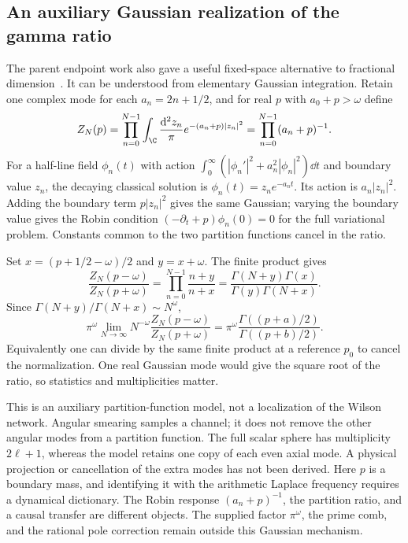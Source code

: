 \subsection{An auxiliary Gaussian realization of the gamma ratio}

The parent endpoint work also gave a useful fixed-space alternative
to fractional dimension~\cite{ParentAngular}. It can be understood
from elementary Gaussian integration. Retain one complex mode for
each $a_n=2n+1/2$, and for real $p$ with $a_0+p>\omega$ define
\begin{equation}
 Z_N(p)=\prod_{n=0}^{N-1}\int_\C\frac{\mathrm d^2z_n}{\pi}
             e^{-(a_n+p)|z_n|^2}
       =\prod_{n=0}^{N-1}(a_n+p)^{-1}.
\end{equation}
For a half-line field $\phi_n(t)$ with action
$\int_0^\infty(|\phi_n'|^2+a_n^2|\phi_n|^2)\dd t$ and boundary value
$z_n$, the decaying classical solution is $\phi_n(t)=z_ne^{-a_nt}$.
Its action is $a_n|z_n|^2$. Adding the boundary term $p|z_n|^2$
gives the same Gaussian; varying the boundary value gives the Robin
condition $(-\partial_t+p)\phi_n(0)=0$ for the full variational problem.
Constants common to the two partition functions cancel in the ratio.

Set $x=(p+1/2-\omega)/2$ and $y=x+\omega$. The finite product gives
\begin{equation}
 \frac{Z_N(p-\omega)}{Z_N(p+\omega)}
 =\prod_{n=0}^{N-1}\frac{n+y}{n+x}
 =\frac{\Gamma(N+y)\Gamma(x)}{\Gamma(y)\Gamma(N+x)}.
\end{equation}
Since $\Gamma(N+y)/\Gamma(N+x)\sim N^{\omega}$,
\begin{equation}\label{eq:gaussian-gamma}
 \pi^\omega\lim_{N\to\infty}N^{-\omega}
 \frac{Z_N(p-\omega)}{Z_N(p+\omega)}
 =\pi^\omega\frac{\Gamma((p+a)/2)}{\Gamma((p+b)/2)}.
\end{equation}
Equivalently one can divide by the same finite product at a reference
$p_0$ to cancel the normalization. One real Gaussian mode would give
the square root of the ratio, so statistics and multiplicities matter.

This is an auxiliary partition-function model, not a localization
of the Wilson network. Angular smearing samples a channel; it does
not remove the other angular modes from a partition function. The
full scalar sphere has multiplicity $2\ell+1$, whereas the model
retains one copy of each even axial mode. A physical projection or
cancellation of the extra modes has not been derived. Here $p$ is a
boundary mass, and identifying it with the arithmetic Laplace
frequency requires a dynamical dictionary. The Robin response
$(a_n+p)^{-1}$, the partition ratio, and a causal transfer are different
objects. The supplied factor $\pi^\omega$, the prime comb, and the
rational pole correction remain outside this Gaussian mechanism.
